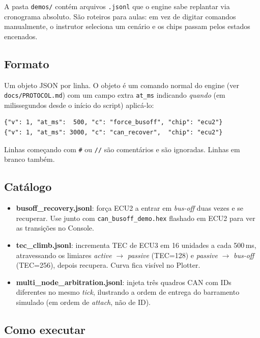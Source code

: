 \documentclass[12pt,a4paper]{article}
\begin{document}
A pasta \texttt{demos/} contém arquivos \texttt{.jsonl} que o engine
sabe replantar via cronograma absoluto. São roteiros para aulas:
em vez de digitar comandos manualmente, o instrutor seleciona um
cenário e os chips passam pelos estados encenados.

\subsection{Formato}

Um objeto JSON por linha. O objeto é um comando normal do engine
(ver \texttt{docs/PROTOCOL.md}) com um campo extra \texttt{at\_ms}
indicando \emph{quando} (em milissegundos desde o início do script)
aplicá-lo:

\begin{lstlisting}
{"v": 1, "at_ms":  500, "c": "force_busoff", "chip": "ecu2"}
{"v": 1, "at_ms": 3000, "c": "can_recover",  "chip": "ecu2"}
\end{lstlisting}

Linhas começando com \texttt{\#} ou \texttt{//} são comentários e são
ignoradas. Linhas em branco também.

\subsection{Catálogo}

\begin{itemize}[nosep]
  \item \textbf{busoff\_recovery.jsonl}: força ECU2 a entrar em
        \emph{bus-off} duas vezes e se recuperar. Use junto com
        \texttt{can\_busoff\_demo.hex} flashado em ECU2 para ver as
        transições no Console.
  \item \textbf{tec\_climb.jsonl}: incrementa TEC de ECU3 em 16
        unidades a cada 500\,ms, atravessando os limiares
        \emph{active} $\to$ \emph{passive} (TEC=128) e
        \emph{passive} $\to$ \emph{bus-off} (TEC=256), depois
        recupera. Curva fica visível no Plotter.
  \item \textbf{multi\_node\_arbitration.jsonl}: injeta três quadros
        CAN com IDs diferentes no mesmo \emph{tick}, ilustrando a
        ordem de entrega do barramento simulado (em ordem de
        \emph{attach}, não de ID).
\end{itemize}

\subsection{Como executar}
\end{document}
